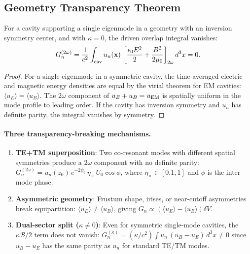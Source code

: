 \documentclass[aps,prd,twocolumn,superscriptaddress,floatfix,nofootinbib]{revtex4-2}
\newcommand{\kap}{\kappa}
\newcommand{\calB}{\mathcal{B}}
\begin{document}
\subsection{Geometry Transparency Theorem}\label{sec:transparency}

\begin{theorem}
For a cavity supporting a single eigenmode in a geometry with an
inversion symmetry center, and with $\kappa = 0$, the driven overlap
integral vanishes:
\begin{equation}
G_n^{(2\omega)} = \frac{1}{c^2}\int_{\rm cav} u_n(\mathbf{x})\,
\left[\frac{\epsilon_0 E^2}{2} + \frac{B^2}{2\mu_0}\right]_{2\omega}
d^3x = 0.
\label{eq:transparency-thm}
\end{equation}
\end{theorem}

\begin{proof}
For a single eigenmode in a symmetric cavity, the time-averaged electric
and magnetic energy densities are equal by the virial theorem for EM
cavities: $\langle u_E \rangle = \langle u_B \rangle$. The $2\omega$
component of $u_E + u_B = u_{\rm EM}$ is spatially uniform in the mode
profile to leading order. If the cavity has inversion symmetry and $u_n$
has definite parity, the integral vanishes by symmetry.
\end{proof}

\paragraph{Three transparency-breaking mechanisms.}
\begin{enumerate}
\item \textbf{TE+TM superposition}: Two co-resonant modes with
different spatial symmetries produce a $2\omega$ component with
no definite parity:
$G_n^{(2\omega)} = u_n(z_0)\,e^{-2\psi_0}\,\eta_\times\,U_0\cos\phi$,
where $\eta_\times \in [0.1, 1]$ and $\phi$ is the inter-mode phase.

\item \textbf{Asymmetric geometry}: Frustum shape, irises, or
near-cutoff asymmetries break equipartition:
$\langle u_E\rangle \neq \langle u_B\rangle$, giving
$G_n \propto (\langle u_E\rangle - \langle u_B\rangle)\delta V$.

\item \textbf{Dual-sector split ($\kappa \neq 0$)}: Even for symmetric
single-mode cavities, the $\kappa\calB/2$ term does not vanish:
$G_n^{(\kap)} = (\kap/c^2)\int u_n\,(u_B - u_E)\,d^3x \neq 0$
since $u_B - u_E$ has the same parity as $u_n$ for standard TE/TM modes.
\end{enumerate}
\end{document}
